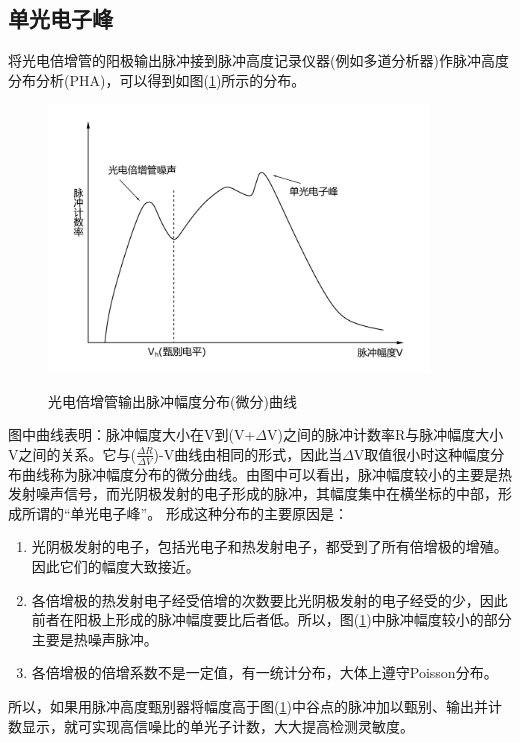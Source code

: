\documentclass[a4paper]{article}
\begin{document}
\subsection{单光电子峰}
将光电倍增管的阳极输出脉冲接到脉冲高度记录仪器(例如多道分析器)作脉冲高度分布分析(PHA)，可以得到如图(\ref{fig4})所示的分布。
\begin{figure}[!h]
\centering
\includegraphics[width=0.9\textwidth]{fig/fig4.pdf}\\
\caption{光电倍增管输出脉冲幅度分布(微分)曲线}\label{fig4}
\end{figure}

图中曲线表明：脉冲幅度大小在V到(V+$\Delta$V)之间的脉冲计数率R与脉冲幅度大小V之间的关系。它与($\frac{\Delta R}{\Delta V}$)-V曲线由相同的形式，因此当$\Delta$V取值很小时这种幅度分布曲线称为脉冲幅度分布的微分曲线。由图中可以看出，脉冲幅度较小的主要是热发射噪声信号，而光阴极发射的电子形成的脉冲，其幅度集中在横坐标的中部，形成所谓的“单光电子峰”。
形成这种分布的主要原因是：
\begin{enumerate}
\item 光阴极发射的电子，包括光电子和热发射电子，都受到了所有倍增极的增殖。因此它们的幅度大致接近。
\item 各倍增极的热发射电子经受倍增的次数要比光阴极发射的电子经受的少，因此前者在阳极上形成的脉冲幅度要比后者低。所以，图(\ref{fig4})中脉冲幅度较小的部分主要是热噪声脉冲。
\item 各倍增极的倍增系数不是一定值，有一统计分布，大体上遵守Poisson分布。
\end{enumerate}
所以，如果用脉冲高度甄别器将幅度高于图(\ref{fig4})中谷点的脉冲加以甄别、输出并计数显示，就可实现高信噪比的单光子计数，大大提高检测灵敏度。
\end{document}
